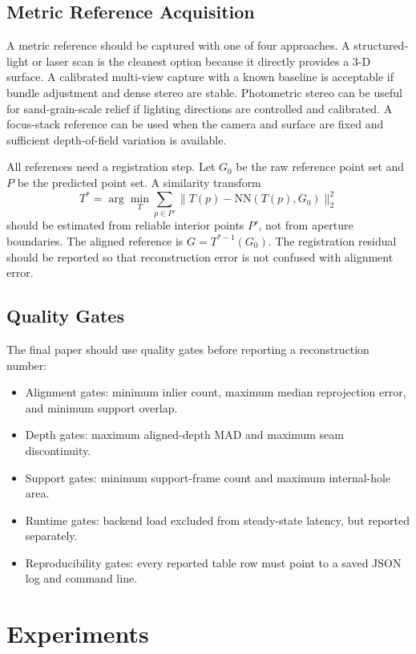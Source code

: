 \documentclass[conference]{IEEEtran}
\begin{document}
\subsection{Metric Reference Acquisition}
A metric reference should be captured with one of four approaches. A structured-light or laser scan is the cleanest option because it directly provides a 3-D surface. A calibrated multi-view capture with a known baseline is acceptable if bundle adjustment and dense stereo are stable. Photometric stereo can be useful for sand-grain-scale relief if lighting directions are controlled and calibrated. A focus-stack reference can be used when the camera and surface are fixed and sufficient depth-of-field variation is available.

All references need a registration step. Let $G_0$ be the raw reference point set and $P$ be the predicted point set. A similarity transform
\begin{equation}
T^*=\arg\min_T \sum_{p\in P'} \|T(p)-\mathrm{NN}(T(p),G_0)\|_2^2
\end{equation}
should be estimated from reliable interior points $P'$, not from aperture boundaries. The aligned reference is $G=T^{*-1}(G_0)$. The registration residual should be reported so that reconstruction error is not confused with alignment error.

\subsection{Quality Gates}
The final paper should use quality gates before reporting a reconstruction number:
\begin{itemize}
\item Alignment gates: minimum inlier count, maximum median reprojection error, and minimum support overlap.
\item Depth gates: maximum aligned-depth MAD and maximum seam discontinuity.
\item Support gates: minimum support-frame count and maximum internal-hole area.
\item Runtime gates: backend load excluded from steady-state latency, but reported separately.
\item Reproducibility gates: every reported table row must point to a saved JSON log and command line.
\end{itemize}

\section{Experiments}
\end{document}
